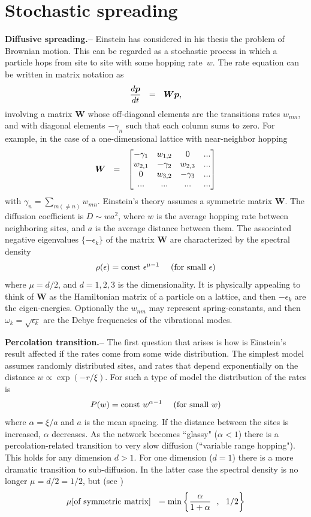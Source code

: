 \documentclass[aps,pre,floats,floatfix,twocolumn]{revtex4}
\newcommand{\const}{\mbox{const}}
\newcommand{\amatrix}[1]{\begin{matrix} #1 \end{matrix}}
\newcommand{\be}[1]{\begin{eqnarray}\ifthenelse{#1=-1}{\nonumber}{\ifthenelse{#1=0}{}{\label{e#1}}}}
\newcommand{\eeq}{\end{eqnarray}}
\newcommand{\sect}[1]{{\bf #1.-- }}
\begin{document}
\section{Stochastic spreading}

\sect{Diffusive spreading}
%
Einstein has considered in his thesis the problem of Brownian motion. 
This can be regarded as a stochastic process in which a particle hops from site to site with some hopping rate~${w}$. The rate equation can be written in matrix notation as 
%
\be{1}
\frac{d\bm{p}}{dt} \ \ = \ \ \bm{W} \bm{p}, 
\eeq
%
involving a matrix ${\bm{W}}$ whose off-diagonal elements are the transitions rates ${w_{nm}}$, 
and with diagonal elements ${-\gamma_n}$ such that each column sums to zero. 
For example, in the case of a one-dimensional lattice with near-neighbor hopping
%
\be{2}
\bm{W} \ \ = \ \ \left[\amatrix{
-\gamma_1   & w_{1,2}   & 0         & ... \\ 
w_{2,1}     & -\gamma_2 & w_{2,3}   & ... \\ 
0           & w_{3,2}   & -\gamma_3 & ... \\
...         & ...       & ...       & ...
}\right]
\eeq 
%
with ${\gamma_n=\sum_{m (\neq n)} w_{mn}}$.
Einstein's theory assumes a symmetric matrix $\bm{W}$.   
The diffusion coefficient is ${D\sim wa^2}$, 
where $w$ is the average hopping rate between neighboring sites, 
and $a$ is the average distance between them.  
The associated negative eigenvalues ${\{-\epsilon_k\}}$ of the matrix $\bm{W}$ 
are characterized by the spectral density 
%
\be{3}
\rho(\epsilon) = \const \ \epsilon^{\mu-1} \ \ \ \ \text{(for small $\epsilon$)}
\eeq
%
where ${\mu=d/2}$, and ${d=1,2,3}$ is the dimensionality. 
It is physically appealing to think of $\bm{W}$ as the 
Hamiltonian matrix of a particle on a lattice, 
and then ${-\epsilon_k}$ are the eigen-energies. 
Optionally the $w_{nm}$ may represent spring-constants, 
and then ${\omega_k=\sqrt{\epsilon_k}}$ are the Debye 
frequencies of the vibrational modes. 


\sect{Percolation transition}
%
The first question that arises is how is Einstein's result affected if the rates come from some wide distribution. The simplest model assumes randomly distributed sites, and rates that depend exponentially on the distance ${w\propto \exp(-r/\xi)}$. For such a type of model the distribution of the rates is 
%
\be{4}
P(w) = \const \ w^{\alpha-1} \ \ \ \ \text{(for small $w$)}
\eeq
%
where ${\alpha=\xi/a}$ and $a$ is the mean spacing. If the distance between the sites is increased, $\alpha$ decreases. 
As the network becomes ``glassy" (${\alpha<1}$) there is a percolation-related transition 
to very slow diffusion (``variable range hopping"). This holds for any dimension ${d>1}$. 
For one dimension ($d=1$) there is a more dramatic transition to sub-diffusion. 
In the latter case the spectral density is no longer ${\mu=d/2=1/2}$, but (see \cite{Alexander}) 
%
\be{5}
\mu [\text{of symmetric matrix}] \ \ = \text{min} \left\{\frac{\alpha}{1+\alpha} \ \ ,  \ \ 1/2 \right \}
\eeq  
\end{document}

